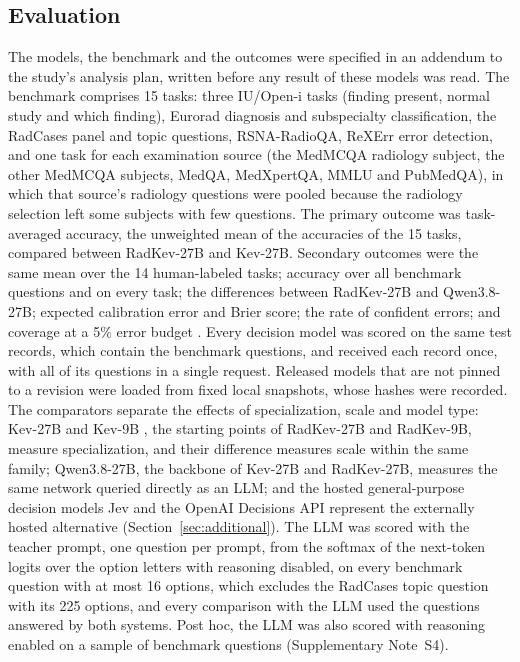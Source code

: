 \documentclass[11pt]{article}
\begin{document}
\FloatBarrier
\subsection{Evaluation}\label{sec:evaluation}

The models, the benchmark and the outcomes were specified in an addendum to the study's analysis plan, written before any result of these models was read. The benchmark comprises 15 tasks: three IU/Open-i tasks (finding present, normal study and which finding), Eurorad diagnosis and subspecialty classification, the RadCases panel and topic questions, RSNA-RadioQA, ReXErr error detection, and one task for each examination source (the MedMCQA radiology subject, the other MedMCQA subjects, MedQA, MedXpertQA, MMLU and PubMedQA), in which that source's radiology questions were pooled because the radiology selection left some subjects with few questions. The primary outcome was task-averaged accuracy, the unweighted mean of the accuracies of the 15 tasks, compared between RadKev-27B and Kev-27B. Secondary outcomes were the same mean over the 14 human-labeled tasks; accuracy over all benchmark questions and on every task; the differences between RadKev-27B and Qwen3.8-27B; expected calibration error and Brier score; the rate of confident errors; and coverage at a 5\% error budget \citep{geifman2017selective}. Every decision model was scored on the same test records, which contain the  benchmark questions, and received each record once, with all of its questions in a single request. Released models that are not pinned to a revision were loaded from fixed local snapshots, whose hashes were recorded. The comparators separate the effects of specialization, scale and model type: Kev-27B and Kev-9B \citep{palmer2026kev}, the starting points of RadKev-27B and RadKev-9B, measure specialization, and their difference measures scale within the same family; Qwen3.8-27B, the backbone of Kev-27B and RadKev-27B, measures the same network queried directly as an LLM; and the hosted general-purpose decision models Jev and the OpenAI Decisions API represent the externally hosted alternative (Section~\ref{sec:additional}). The LLM was scored with the teacher prompt, one question per prompt, from the softmax of the next-token logits over the option letters with reasoning disabled, on every benchmark question with at most 16 options, which excludes the RadCases topic question with its 225 options, and every comparison with the LLM used the questions answered by both systems. Post hoc, the LLM was also scored with reasoning enabled on a sample of  benchmark questions (Supplementary Note~S4).
\end{document}
